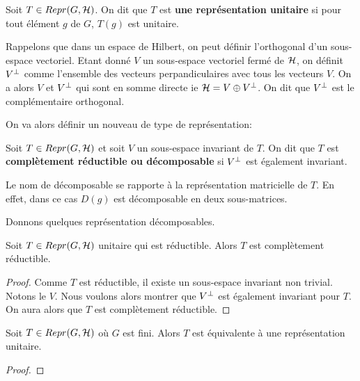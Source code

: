 \begin{definition}
	Soit $T \in Repr(G, \mathcal{H})$. On dit que $T$ est \textbf{une
	représentation unitaire} si pour tout élément $g$ de $G$, $T(g)$ est unitaire.
\end{definition}

Rappelons que dans un espace de Hilbert, on peut définir l'orthogonal d'un
sous-espace vectoriel. Etant donné $V$ un sous-espace vectoriel fermé de $\mathcal{H}$,
on définit $V^{\perp}$ comme l'ensemble des vecteurs perpandiculaires avec
tous les vecteurs $V$. On a alors $V$ et $V^{\perp}$ qui sont en somme
directe ie $\mathcal{H} = V \oplus V^{\perp}$. On dit que $V^{\perp}$ est le
complémentaire orthogonal.

On va alors définir un nouveau de type de représentation:

\begin{definition}
	Soit $T \in Repr(G, \mathcal{H})$ et soit $V$ un sous-espace invariant de
	$T$.
	On dit que $T$ est \textbf{complètement réductible ou décomposable} si
	$V^{\perp}$ est également invariant.
\end{definition}

Le nom de décomposable se rapporte à la représentation matricielle de $T$. En
effet, dans ce cas $D(g)$ est décomposable en deux sous-matrices.


Donnons quelques représentation décomposables.

\begin{proposition}
	Soit $T \in Repr(G, \mathcal{H})$ unitaire qui est réductible. Alors $T$
	est complètement réductible.
\end{proposition}

\begin{proof}
	Comme $T$ est réductible, il existe un sous-espace invariant non trivial.
	Notons le $V$.
	Nous voulons alors montrer que $V^{\perp}$ est également invariant pour
	$T$. On aura alors que $T$ est complètement réductible.
\end{proof}

\begin{proposition}
	Soit $T \in Repr(G, \mathcal{H})$ où $G$ est fini. Alors $T$ est équivalente à une
	représentation unitaire.
\end{proposition}

\begin{proof}

\end{proof}

